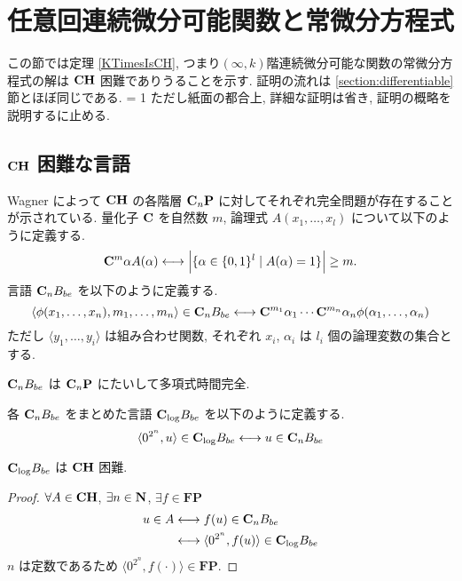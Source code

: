 \section{任意回連続微分可能関数と常微分方程式}

この節では定理 \ref{KTimesIsCH}, 
つまり$(\infty, k)$階連続微分可能な関数の常微分方程式の解は
$\mathbf{CH}$ 困難でありうることを示す.
証明の流れは \ref{section:differentiable} 節とほぼ同じである.
\ifnum \proc = 1
ただし紙面の都合上, 詳細な証明は省き, 証明の概略を説明するに止める.
\fi


\subsection{$\mathbf{CH}$ 困難な言語}

Wagner によって $\mathbf{CH}$ の各階層 $\mathbf{C}_n \mathbf{P}$ に対してそれぞれ完全問題が存在することが示されている\cite{wagner1986complexity}.
量化子 $\mathbf{C}$ を自然数 $m$, 論理式 $A(x_1, \dots, x_l)$ について以下のように定義する.
\begin{equation}
 \mathbf{C}^m \alpha A(\alpha) 
  \longleftrightarrow 
  \Bigl|\{\alpha \in \{0,1\}^l \mid A(\alpha) = 1\}\Bigr| \ge m.
\end{equation}
言語 $\mathbf{C}_n B_{be}$ を以下のように定義する.
\begin{equation}
 \langle \phi(x_1, \dots, x_n), m_1, \dots, m_n \rangle \in \mathbf{C}_n B_{be}
 \longleftrightarrow
 \mathbf{C}^{m_1}{\alpha_1} \cdots \mathbf{C}^{m_n}{\alpha_n} \phi(\alpha_1, \dots, \alpha_n) 
\end{equation}
ただし $\langle y_1, \dots, y_i \rangle$ は組み合わせ関数,
それぞれ $x_i$, $\alpha_i$ は $l_i$ 個の論理変数の集合とする.


\begin{lemma}
 $\mathbf{C}_n B_{be}$ は $\mathbf{C}_n\mathbf{P}$ にたいして多項式時間完全.
\end{lemma}


各 $\mathbf{C}_n B_{be}$ をまとめた言語 $\mathbf{C}_{\log} B_{be}$ を以下のように定義する.
\[
 \langle 0^{2^n}, u \rangle \in \mathbf{C}_{\log} B_{be}
 \longleftrightarrow
 u \in \mathbf{C}_n B_{be}
\]

\begin{lemma}
 $\mathbf{C}_{\log} B_{be}$ は $\mathbf{CH}$ 困難.
\end{lemma}

\begin{proof}
 $\forall A \in \mathbf{CH}$, $\exists n \in \mathbf N$, $\exists f \in \mathbf{FP}$
 \begin{align}
  u \in A 
  & \longleftrightarrow f(u) \in \mathbf{C}_n B_{be}\\
  & \longleftrightarrow \langle 0^{2^n}, f(u) \rangle \in \mathbf{C}_{\log} B_{be}
 \end{align}
 $n$ は定数であるため $\langle 0^{2^n}, f(\cdot) \rangle \in \mathbf{FP}$.
\end{proof}

